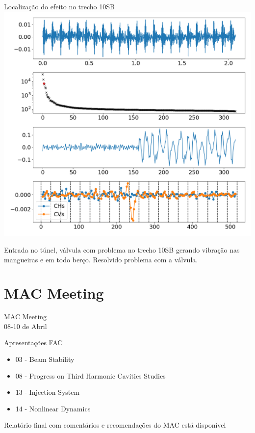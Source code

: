 \documentclass[1611]{beamer}					  %
\begin{document}
\begin{frame}{Localização do efeito no trecho 10SB}
\centering
    \includegraphics[scale=0.25]{2024-04-19/figures/bpm_data_rate_fofb_sofbstate_off_fofbstate_off_gain_0p052_rfline_off_llrf_ki_8000_kp_155.png}

Entrada no túnel, válvula com problema no trecho 10SB gerando vibração nas mangueiras e em todo berço. Resolvido problema com a válvula.
\end{frame}

\section{MAC Meeting}

\begin{frame}
    \Huge{MAC Meeting}\\
    \normalsize{08-10 de Abril}
\end{frame}

\begin{frame}{Apresentações FAC}
    \begin{itemize}
        \item 03 - Beam Stability
        \item 08 - Progress on Third Harmonic Cavities Studies
        \item 13 - Injection System
        \item 14 - Nonlinear Dynamics
    \end{itemize}

    Relatório final com comentários e recomendações do MAC está disponível
\end{frame}
\end{document}
